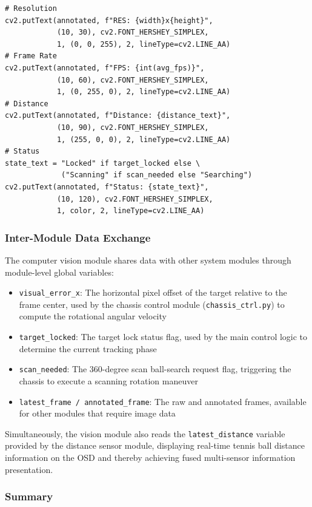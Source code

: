 \begin{verbatim}
# Resolution
cv2.putText(annotated, f"RES: {width}x{height}",
            (10, 30), cv2.FONT_HERSHEY_SIMPLEX,
            1, (0, 0, 255), 2, lineType=cv2.LINE_AA)
# Frame Rate
cv2.putText(annotated, f"FPS: {int(avg_fps)}",
            (10, 60), cv2.FONT_HERSHEY_SIMPLEX,
            1, (0, 255, 0), 2, lineType=cv2.LINE_AA)
# Distance
cv2.putText(annotated, f"Distance: {distance_text}",
            (10, 90), cv2.FONT_HERSHEY_SIMPLEX,
            1, (255, 0, 0), 2, lineType=cv2.LINE_AA)
# Status
state_text = "Locked" if target_locked else \
             ("Scanning" if scan_needed else "Searching")
cv2.putText(annotated, f"Status: {state_text}",
            (10, 120), cv2.FONT_HERSHEY_SIMPLEX,
            1, color, 2, lineType=cv2.LINE_AA)
\end{verbatim}

\subsubsection{Inter-Module Data Exchange}
\label{sec:cv:interface}

The computer vision module shares data with other system modules through module-level global variables:

\begin{itemize}
    \item \texttt{visual\_error\_x}: The horizontal pixel offset of the target relative to the frame center, used by the chassis control module (\texttt{chassis\_ctrl.py}) to compute the rotational angular velocity
    \item \texttt{target\_locked}: The target lock status flag, used by the main control logic to determine the current tracking phase
    \item \texttt{scan\_needed}: The 360-degree scan ball-search request flag, triggering the chassis to execute a scanning rotation maneuver
    \item \texttt{latest\_frame / annotated\_frame}: The raw and annotated frames, available for other modules that require image data
\end{itemize}

Simultaneously, the vision module also reads the \texttt{latest\_distance} variable provided by the distance sensor module, displaying real-time tennis ball distance information on the OSD and thereby achieving fused multi-sensor information presentation.

\subsubsection{Summary}
\label{sec:cv:summary}

